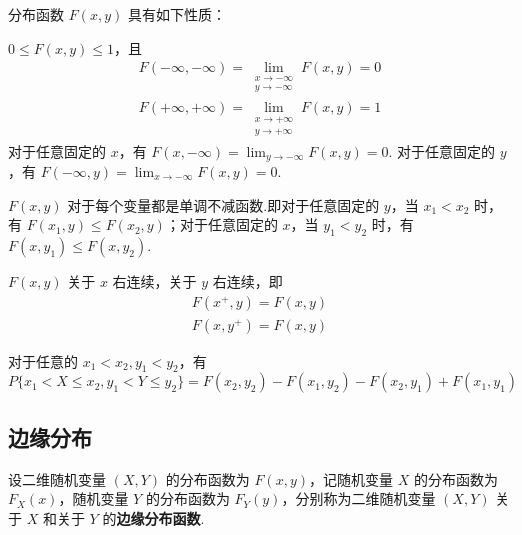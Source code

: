 分布函数 $F(x,y)$ 具有如下性质：

\setcounter{propertyname}{0}

\begin{property}
    $0 \leqslant F(x,y) \leqslant 1$，且
    \begin{gather*}
        F(-\infty, -\infty) = \lim_{\substack{x \to -\infty \\ y \to -\infty}} F(x,y) = 0 \\
        F(+\infty, +\infty) = \lim_{\substack{x \to +\infty \\ y \to +\infty}} F(x,y) = 1
    \end{gather*}
    对于任意固定的 $x$，有 $F(x,-\infty) = \displaystyle\lim_{y \to -\infty} F(x,y) = 0$.\newline
    对于任意固定的 $y$，有 $F(-\infty,y) = \displaystyle\lim_{x \to -\infty} F(x,y) = 0$.
\end{property}

\begin{property}
    $F(x,y)$ 对于每个变量都是单调不减函数.即对于任意固定的 $y$，当 $x_1 < x_2$ 时，有 $F(x_1, y) \leqslant F(x_2, y)$；对于任意固定的 $x$，当 $y_1 < y_2$ 时，有 $F(x, y_1) \leqslant F(x, y_2)$.
\end{property}

\begin{property}
    $F(x,y)$ 关于 $x$ 右连续，关于 $y$ 右连续，即
    \begin{gather*}
        F(x^+, y) = F(x, y) \\
        F(x, y^+) = F(x, y)
    \end{gather*}
\end{property}

\begin{property}
    对于任意的 $x_1 < x_2, y_1 < y_2$，有
    $$
    P\{x_1 < X \leqslant x_2, y_1 < Y \leqslant y_2\} = F(x_2, y_2) - F(x_1, y_2) - F(x_2, y_1) + F(x_1, y_1)
    $$
\end{property}

\subsection{边缘分布}

\begin{definition}
    设二维随机变量 $(X,Y)$ 的分布函数为 $F(x,y)$，记随机变量 $X$ 的分布函数为 $F_{X}(x)$，随机变量 $Y$ 的分布函数为 $F_{Y}(y)$，分别称为二维随机变量 $(X,Y)$ 关于 $X$ 和关于 $Y$ 的\textbf{边缘分布函数}.
\end{definition}

